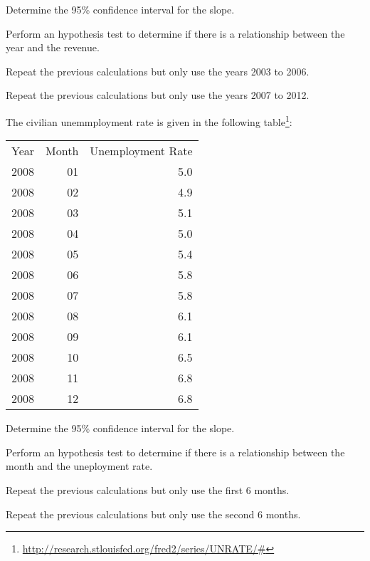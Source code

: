 \begin{problem}
  \begin{subproblem}
    \item Determine the 95\% confidence interval for the slope.
      \vfill
    \item Perform an hypothesis test to determine if there is a
      relationship between the year and the revenue.
      \vfill
    \item Repeat the previous calculations but only use the years 2003 to 2006.
      \vfill
    \item Repeat the previous calculations but only use the years 2007 to 2012.
      \vfill
  \end{subproblem}

  \clearpage

\item The civilian unemmployment rate is given in the following
  table\footnote{\url{http://research.stlouisfed.org/fred2/series/UNRATE/\#}}:

  \begin{tabular}{rrr}
    Year & Month & Unemployment Rate \\
    2008 & 01    & 5.0 \\
    2008 & 02    & 4.9 \\
    2008 & 03    & 5.1 \\
    2008 & 04    & 5.0 \\
    2008 & 05    & 5.4 \\
    2008 & 06    & 5.8 \\
    2008 & 07    & 5.8 \\
    2008 & 08    & 6.1 \\
    2008 & 09    & 6.1 \\
    2008 & 10    & 6.5 \\
    2008 & 11    & 6.8 \\
    2008 & 12    & 6.8
  \end{tabular}

  \begin{subproblem}
    \item Determine the 95\% confidence interval for the slope.
      \vfill
    \item Perform an hypothesis test to determine if there is a
      relationship between the month and the uneployment rate.
      \vfill
    \item Repeat the previous calculations but only use the first 6 months.
      \vfill
    \item Repeat the previous calculations but only use the second 6 months.
      \vfill
  \end{subproblem}


\end{problem}